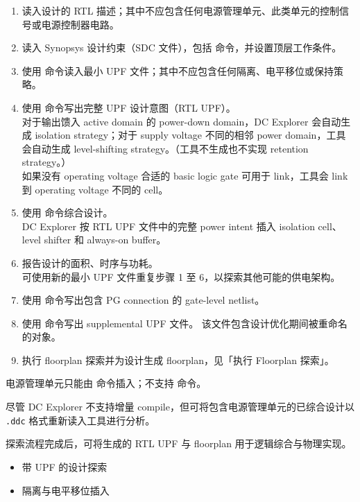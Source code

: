 \begin{enumerate}
  \item 读入设计的 RTL 描述；其中不应包含任何电源管理单元、此类单元的控制信号或电源控制器电路。
  \item 读入 Synopsys 设计约束（SDC 文件），包括  命令，并设置顶层工作条件。
  \item 使用  命令读入最小 UPF 文件；其中不应包含任何隔离、电平移位或保持策略。
  \item 使用  命令写出完整 UPF 设计意图（RTL UPF）。\\
        对于输出馈入 active domain 的 power-down domain，DC Explorer 会自动生成 isolation strategy；对于 supply voltage 不同的相邻 power domain，工具会自动生成 level-shifting strategy。（工具不生成也不实现 retention strategy。）\\
        如果没有 operating voltage 合适的 basic logic gate 可用于 link，工具会 link 到 operating voltage 不同的 cell。
  \item 使用  命令综合设计。\\
        DC Explorer 按 RTL UPF 文件中的完整 power intent 插入 isolation cell、level shifter 和 always-on buffer。
  \item 报告设计的面积、时序与功耗。\\
        可使用新的最小 UPF 文件重复步骤 1 至 6，以探索其他可能的供电架构。
  \item 使用  命令写出包含 PG connection 的 gate-level netlist。
  \item 使用   命令写出 supplemental UPF 文件。
        该文件包含设计优化期间被重命名的对象。
  \item 执行 floorplan 探索并为设计生成 floorplan，见「执行 Floorplan 探索」。
\end{enumerate}

\begin{noteBox}
电源管理单元只能由  命令插入；不支持  命令。

尽管 DC Explorer 不支持增量 compile，但可将包含电源管理单元的已综合设计以 \texttt{.ddc} 格式重新读入工具进行分析。
\end{noteBox}

探索流程完成后，可将生成的 RTL UPF 与 floorplan 用于逻辑综合与物理实现。

\begin{seeAlsoBox}
\begin{itemize}
  \item 带 UPF 的设计探索
  \item 隔离与电平移位插入
\end{itemize}
\end{seeAlsoBox}

